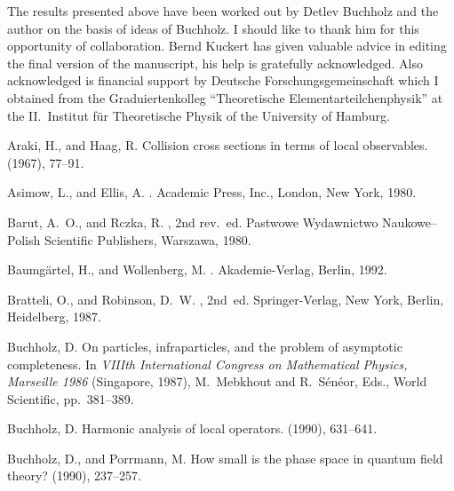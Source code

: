 \documentclass[a4paper,a4paper]{article}
\numberwithin{equation}{section}
\theoremstyle{definition}
\theoremstyle{plain}
\theoremstyle{remark}
\begin{document}
    The results presented above have been worked out by Detlev
    Buchholz and the author on the basis of ideas of Buchholz. I
    should like to thank him for this opportunity of collaboration.
    Bernd Kuckert has given valuable advice in editing the final
    version of the manuscript, his help is gratefully acknowledged.
    Also acknowledged is financial support by Deutsche
    Forschungsgemeinschaft which I obtained from the Graduiertenkolleg
    ``Theoretische Elementarteilchenphysik'' at the II.~Institut f\"ur
    Theoretische Physik of the University of Hamburg.


\providecommand{\SortNoop}[1]{}
\begin{thebibliography}{10}

{\sc Araki, H., and Haag, R.}
\newblock Collision cross sections in terms of local observables.
 (1967), 77--91.

{\sc Asimow, L., and Ellis, A.}
.
\newblock Academic Press, Inc., London, New York, 1980.

{\sc Barut, A.~O., and Rczka, R.}
, 2nd rev.~ed.
\newblock Pastwowe Wydawnictwo Naukowe--Polish Scientific
  Publishers, Warszawa, 1980.

{\sc Baumg\"artel, H., and Wollenberg, M.}
.
\newblock Akademie-Verlag, Berlin, 1992.

{\sc Bratteli, O., and Robinson, D.~W.}
, 2nd~ed.
\newblock Springer-Verlag, New York, Berlin, Heidelberg, \SortNoop{79}1987.

{\sc Buchholz, D.}
\newblock On particles, infraparticles, and the problem of asymptotic
  completeness.
\newblock In {\em VIIIth International Congress on Mathematical Physics,
  \textnormal{Marseille 1986}\/} (Singapore, 1987), M.~Mebkhout and
  R.~S\'{e}n\'{e}or, Eds., World Scientific, pp.~381--389.

{\sc Buchholz, D.}
\newblock Harmonic analysis of local operators.
 (1990), 631--641.

{\sc Buchholz, D., and Porrmann, M.}
\newblock How small is the phase space in quantum field theory?
 (1990),
  237--257.


\end{thebibliography}
\end{document}

